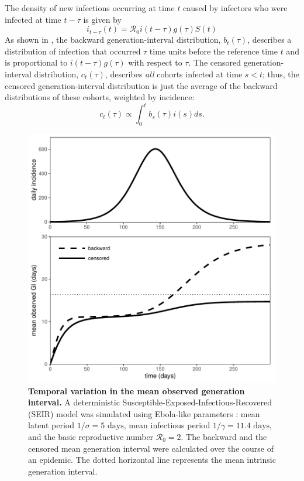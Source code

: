 \documentclass[12pt]{article}
\newcommand{\RR}{\ensuremath{{\mathcal R}}}
\begin{document}
The density of new infections occurring at time $t$ caused by infectors who were infected at time $t-\tau$ is given by
\begin{equation}
i_{t-\tau}(t) = \RR_0 i(t-\tau) g(\tau) S(t)
\end{equation}
As shown in \cite{champredon2015intrinsic}, the backward generation-interval distribution, $b_t(\tau)$, describes a distribution of infection that occurred $\tau$ time units before the reference time $t$ and is proportional to $i(t-\tau) g(\tau)$ with respect to $\tau$.
The censored generation-interval distribution, $c_t(\tau)$, describes \emph{all} cohorts infected at time $s<t$; thus, the censored generation-interval distribution is just the average of the backward distributions of these cohorts, weighted by incidence:
\begin{equation}
c_t(\tau) \propto \int_0^t b_s(\tau) i(s) ds.
\end{equation}

\begin{figure}[!pbth]
\includegraphics[width=\textwidth]{../fig/temporal_effect.pdf}
\caption{\textbf{Temporal variation in the mean observed generation interval.}
A deterministic Susceptible-Exposed-Infectious-Recovered (SEIR) model was simulated using Ebola-like parameters \citep{who2014ebola}: mean latent period $1/\sigma = 5 \textrm{ days}$, mean infectious period $1/\gamma = 11.4 \textrm{ days}$, and the basic reproductive number $\RR_0 = 2$. 
The backward and the censored mean generation interval were calculated over the course of an epidemic.
The dotted horizontal line represents the mean intrinsic generation interval.
}
\label{fig:censor}
\end{figure}
\end{document}
